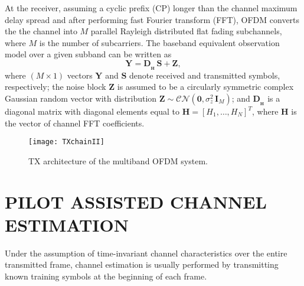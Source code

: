 \documentclass{article}
\def\Yb{{\mathbf Y}}
\def\Sb{{\mathbf S}}
\def\Hb{{\mathbf H}}
\def\Zb{{\mathbf Z}}
\begin{document}
At the receiver, assuming a cyclic prefix (CP) longer than the channel maximum delay spread and after performing fast Fourier transform (FFT), OFDM converts the the channel into $M$ parallel Rayleigh distributed flat fading subchannels, where $M$ is the number of subcarriers.
The baseband equivalent observation model over a given subband can be written as 
\begin{equation} 
\label{eq:sysmodel}
       \Yb = \mathbf{D}_{_\Hb} \,\Sb + \Zb, 
\end{equation}         
where $(M \times 1)$ vectors $\Yb$ and $\Sb$ denote received and transmitted symbols, respectively; the noise block $\Zb$ is assumed to be a circularly symmetric complex Gaussian random vector with distribution $\Zb \sim \mathcal{CN}(\mathbf{0},{\sigma}^2_z \, \mathbf{I}_M)$; and $\mathbf{D}_{_\Hb}$ is a diagonal matrix with diagonal elements equal to $\Hb=[H_1,\ldots,H_N]^T$, where $\Hb$ is the vector of channel FFT coefficients.  

\begin{figure}[!t]
\centering
{}
\texttt{[image: TXchainII]}
\caption{TX architecture of the multiband OFDM system.}\label{fig1}
\end{figure}
\section{PILOT ASSISTED CHANNEL ESTIMATION}
\label{sec:pilot}
Under the assumption of time-invariant channel characteristics over the entire transmitted frame, channel estimation is usually performed by transmitting known training symbols at the beginning of each frame. 
\end{document}
